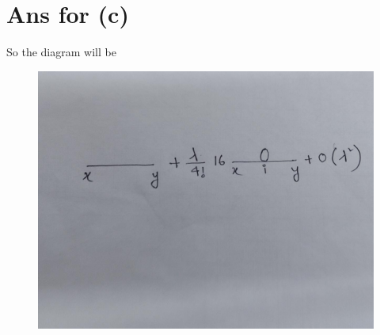 \documentclass[12pt, letterpaper]{article}
\newcommand*{\1}{\hspace{1pt}}
\begin{document}
    \section*{Ans for (c)}

    So the diagram will be 
    \begin{figure}[h]
    \centering
    \includegraphics[scale=.05]{pic}
    \end{figure}
\end{document}
